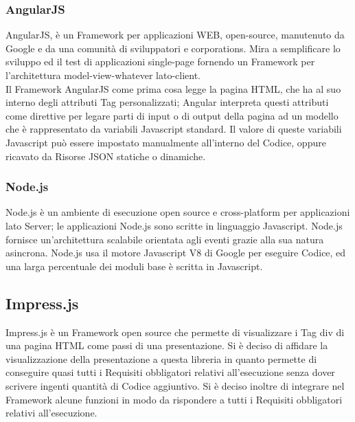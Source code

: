 	\subsubsection{AngularJS}{
		AngularJS, è un Framework per applicazioni WEB, open-source, manutenuto da Google e da una comunità di sviluppatori e corporations. Mira a semplificare lo sviluppo ed il test di applicazioni single-page fornendo un Framework per l'architettura model-view-whatever lato-client. \\
		Il Framework AngularJS come prima cosa legge la pagina HTML, che ha al suo interno degli attributi Tag personalizzati; Angular interpreta questi attributi come direttive per legare parti di input o di output della pagina ad un modello che è rappresentato da variabili Javascript standard. Il valore di queste variabili Javascript può essere impostato manualmente all'interno del Codice, oppure ricavato da Risorse JSON statiche o dinamiche.
	}
	\subsubsection{Node.js}{
		Node.js è un ambiente di esecuzione open source e cross-platform per applicazioni lato Server; le applicazioni Node.js sono scritte in linguaggio Javascript. Node.js fornisce un'architettura scalabile orientata agli eventi grazie alla sua natura asincrona.
		Node.js usa il motore Javascript V8 di Google per eseguire Codice, ed una larga percentuale dei moduli base è scritta in Javascript.
	}
	\subsection{Impress.js}{
		Impress.js è un Framework open source che permette di visualizzare i Tag div di una pagina HTML come passi di una presentazione. Si è deciso di affidare la visualizzazione della presentazione a questa libreria in quanto permette di conseguire quasi tutti i Requisiti obbligatori relativi all’esecuzione senza dover scrivere ingenti quantità di Codice aggiuntivo.
		Si è deciso inoltre di integrare nel Framework alcune funzioni in modo da rispondere a tutti i Requisiti obbligatori relativi all’esecuzione.
	}